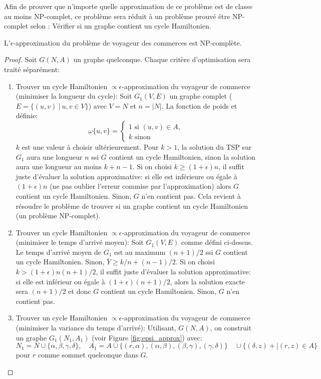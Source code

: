 \documentclass[../main.tex]{subfiles}
\begin{document}
Afin de prouver que n'importe quelle approximation de ce problème est de classe au moins NP-complet, ce problème sera réduit à un problème prouvé être NP-complet selon \cite{Karp1972}: Vérifier si un graphe contient un cycle Hamiltonien.

\begin{theorem}
L'$\epsilon$-approximation du problème de voyageur des commerces est NP-complète.
\end{theorem}

\begin{proof}
Soit $G(N,A)$ un graphe quelconque. Chaque critère d'optimisation sera traité séparément:
\begin{enumerate}
\item Trouver un cycle Hamiltonien $\propto \! \epsilon$-approximation du voyageur de commerce (minimiser la longueur du cycle): Soit $G_1(V, E)$ un graphe complet ($E = \{(u,v)\ |\ u,v \in V\}$) avec $V = N$ et $n = |N|$. La fonction de poids et définie:
\[
\omega \{u, v\} = \begin{cases}
\text{1 si } (u,v)\in A,\\
k \text{ sinon}
\end{cases}
\]
$k$ est une valeur à choisir ultérieurement. Pour $k > 1$, la solution du TSP sur $G_1$ aura une longueur $n$ ssi $G$ contient un cycle Hamiltonien, sinon la solution aura une longueur au moins $k + n -1$. Si on choisi $k \geq (1+\epsilon)n$, il suffit juste d'évaluer la solution approximative: si elle est inférieure ou égale à $(1+ \epsilon)n$ (ne pas oublier l'erreur commise par l'approximation) alors $G$ contient un cycle Hamiltonien. Sinon, $G$ n'en contient pas. Cela revient à résoudre le problème de trouver si un graphe contient un cycle Hamiltonien (un problème NP-complet).
\item Trouver un cycle Hamiltonien $\propto \! \epsilon$-approximation du voyageur de commerce (minimiser le temps d'arrivé moyen): Soit $G_1(V,E)$ comme défini ci-dessus. Le temps d'arrivé moyen de $G_1$ est au maximum $(n+1)/2$ ssi $G$ contient un cycle Hamiltonien. Sinon, $\bar{Y} \geq k/n + (n-1)/2$. Si on choisi $k > (1+\epsilon)n(n+1)/2$, il suffit juste d'évaluer la solution approximative: si elle est inférieur ou égale à $(1+\epsilon)(n+1)/2$, alors la solution exacte sera $(n+1)/2$ et donc $G$ contient un cycle Hamiltonien. Sinon, $G$ n'en contient pas.
\item Trouver un cycle Hamiltonien $\propto \! \epsilon$-approximation du voyageur de commerce (minimiser la variance du temps d'arrivé): Utilisant, $G(N,A)$, on construit un graphe $G_1(N_1, A_1)$ (voir Figure \ref{fig:epsi_approx}) avec:
\[
N_1 = N \cup \{\alpha, \beta, \gamma, \delta \}, \quad A_1 = A \cup \{(r, \alpha),(\alpha, \beta),(\beta, \gamma),(\gamma, \delta)\} \quad \cup  \{(\delta, z) +| (r,z)\in A\}
\]
pour $r$ comme sommet quelconque dans $G$.
\end{enumerate}
\end{proof}
\end{document}
